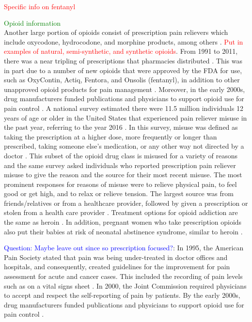 \documentclass[12pt]{article}
\begin{document}
\textcolor{red}{Specific info on fentanyl}

\textcolor{green}{Opioid information} \\
Another large portion of opioids consist of prescription pain relievers which include oxycodone, hydrocodone, and morphine products, among others \cite{CDC3}. \textcolor{red}{Put in examples of natural, semi-synthetic, and synthetic opioids}. From 1991 to 2011, there was a near tripling of prescriptions that pharmacies distributed \cite{NIDA1}. This was in part due to a number of new opioids that were approved by the FDA for use, such as OxyContin, Actiq, Fentora, and Onsolis (fentanyl), in addition to other unapproved opioid products for pain management \cite{FDA1}. Moreover, in the early 2000s, drug manufacturers funded publications and physicians to support opioid use for pain control \cite{Mandell}. A national survey estimated there were 11.5 million individuals 12 years of age or older in the United States that experienced pain reliever misuse in the past year, referring to the year 2016 \cite{CDC2}. In this survey, misuse was defined as taking the prescription at a higher dose, more frequently or longer than prescribed, taking someone else's medication, or any other way not directed by a doctor \cite{SAMSHA3}. This subset of the opioid drug class is misused for a variety of reasons and the same survey asked individuals who reported prescription pain reliever misuse to give the reason and the source for their most recent misuse. The most prominent responses for reasons of misuse were to relieve physical pain, to feel good or get high, and to relax or relieve tension. The largest source was from friends/relatives or from a healthcare provider, followed by given a prescription or stolen from a health care provider \cite{CDC2}. Treatment options for opioid addiction are the same as heroin \cite{SAMSHA1}. In addition, pregnant women who take prescription opioids also put their babies at risk of neonatal abstinence syndrome, similar to heroin \cite{CDC5}. 

\textcolor{blue}{Question: Maybe leave out since so prescription focused?}: In 1995, the American Pain Society stated that pain was being under-treated in doctor offices and hospitals, and consequently, created guidelines for the improvement for pain assessment for acute and cancer cases. This included the recording of pain levels such as on a vital signs sheet \cite{Mandell, APSQCC}. In 2000, the Joint Commission required physicians to accept and respect the self-reporting of pain by patients. By the early 2000s, drug manufacturers funded publications and physicians to support opioid use for pain control \cite{Mandell}.  
\end{document}
